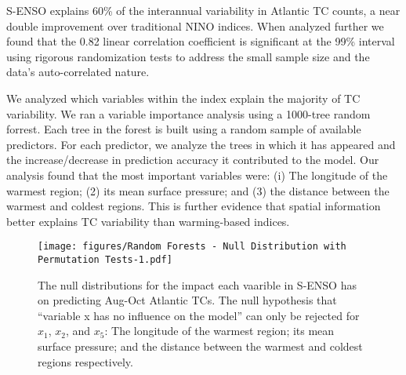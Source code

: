 S-ENSO explains 60\% of the interannual variability in Atlantic TC counts, a near double improvement over traditional NINO indices. When analyzed further we found that the 0.82 linear correlation coefficient is significant at the 99\% interval using rigorous randomization tests to address the small sample size and the data's auto-correlated nature.

We analyzed which variables within the index explain the majority of TC variability. We ran a variable importance analysis using a 1000-tree random forrest. Each tree in the forest is built using a random sample of available predictors. For each predictor, we analyze the trees in which it has appeared and the increase/decrease in prediction accuracy it contributed to the model. Our analysis found that the most important variables were: (i) The longitude of the warmest region; (2) its mean surface pressure; and (3) the distance between the warmest and coldest regions. This is further evidence that spatial information better explains TC variability than warming-based indices.
\begin{figure}[htbp]
	\centering
		\texttt{[image: figures/Random Forests - Null Distribution with Permutation Tests-1.pdf]}
	\caption{The null distributions for the impact each vaarible in S-ENSO has on predicting Aug-Oct Atlantic TCs. The null hypothesis that ``variable x has no influence on the model'' can only be rejected for $x_1$, $x_2$, and $x_5$: The longitude of the warmest region; its mean surface pressure; and the distance between the warmest and coldest regions respectively.}
	\label{fig:Downloads_Random Forests - Null Distribution with Permutation Tests-1}
\end{figure}

